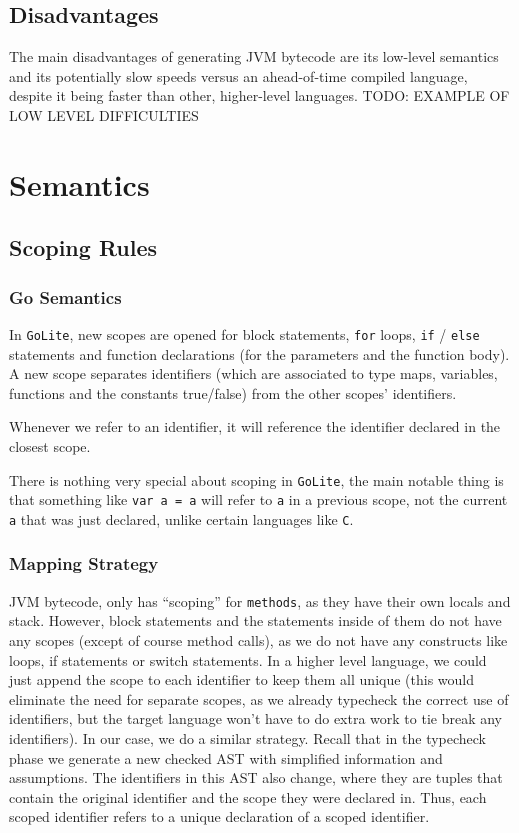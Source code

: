 \documentclass[11pt]{article}
\begin{document}
\subsection{Disadvantages}
\label{sec:org37bbdd9}
The main disadvantages of generating JVM bytecode are its low-level semantics
and its potentially slow speeds versus an ahead-of-time compiled language,
despite it being faster than other, higher-level languages.
TODO: EXAMPLE OF LOW LEVEL DIFFICULTIES
\section{Semantics}
\label{sec:org5833597}
\subsection{Scoping Rules}
\label{sec:org58ac8cf}
\subsubsection{Go Semantics}
\label{sec:org9843aa6}
In \texttt{GoLite}, new scopes are opened for block statements, \texttt{for}
loops, \texttt{if} / \texttt{else} statements and function declarations (for the
parameters and the function body). A new scope separates
identifiers (which are associated to type maps, variables,
functions and the constants true/false) from the other scopes'
identifiers.

Whenever we refer to an identifier, it will reference the
identifier declared in the closest scope.

There is nothing very special about scoping in \texttt{GoLite}, the main
notable thing is that something like \texttt{var a = a} will refer to \texttt{a}
in a previous scope, not the current \texttt{a} that was just declared,
unlike certain languages like \texttt{C}.
\subsubsection{Mapping Strategy}
\label{sec:orgdc81914}
JVM bytecode, only has ``scoping'' for \texttt{methods}, as they have
their own locals and stack. However, block statements and the
statements inside of them do not have any scopes (except of course
method calls), as we do not have any constructs like loops, if
statements or switch statements. In a higher level language, we
could just append the scope to each identifier to keep them all
unique (this would eliminate the need for separate scopes, as we
already typecheck the correct use of identifiers, but the target
language won't have to do extra work to tie break any
identifiers). In our case, we do a similar strategy. Recall that
in the typecheck phase we generate a new checked AST with
simplified information and assumptions. The identifiers in this
AST also change, where they are tuples that contain the original
identifier and the scope they were declared in. Thus, each scoped
identifier refers to a unique declaration of a scoped identifier.
\end{document}
